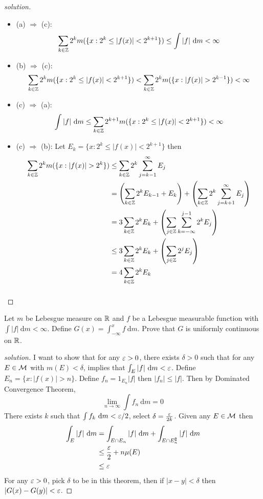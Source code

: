 \begin{proof}[solution]
  \begin{itemize}
    \item (a) $\Rightarrow$ (c): 
      \[\sum_{k \in \mathbb Z} 2^km(\{x : 2^k \le |f(x)| < 2^{k+1}\}) \le \int |f| \ \mathrm{d}m < \infty\]
    \item (b) $\Rightarrow$ (c): 
    \[\sum_{k \in \mathbb Z} 2^km(\{x : 2^k \le |f(x)| < 2^{k+1}\}) < \sum_{k \in \mathbb Z} 2^km(\{x : |f(x)| > 2^{k-1}\}) < \infty\]
    \item (c) $\Rightarrow$ (a): 
    \[\int |f| \ \mathrm{d}m \le \sum_{k\in \mathbb Z} 2^{k+1}m(\{x : 2^k \le |f(x)| < 2^{k+1}\}) < \infty\]
    \item (c) $\Rightarrow$ (b): 
    Let $E_k = \{x : 2^k \le |f(x)| < 2^{k+1}\}$ then
    \begin{align*}
      \sum_{k \in \mathbb Z} 2^km(\{x : |f(x)| > 2^k\}) &\le \sum_{k \in \mathbb Z} 2^k \sum_{j=k-1}^\infty E_j\\
      &= \left(\sum_{k \in \mathbb Z} 2^k E_{k-1} + E_k\right) + \left(\sum_{k \in \mathbb Z}2^k\sum_{j=k+1}^\infty E_j\right) \\
      &= 3\sum_{k \in \mathbb Z} 2^kE_k + \left(\sum_{j \in \mathbb Z} \sum_{k=-\infty}^{j-1} 2^k E_j\right) \\
      &\le 3\sum_{k \in \mathbb Z} 2^kE_k + \left(\sum_{j \in \mathbb Z} 2^j E_j\right) \\
      &= 4\sum_{k \in \mathbb Z} 2^kE_k
    \end{align*}
    \[ \]
  \end{itemize}
\end{proof}

\begin{problem}
  Let $m$ be Lebesgue measure on $\mathbb R$ and $f$ be a Lebesgue measurable function with $\int |f|\ \mathrm{d}m < \infty$. 
  Define $G(x) = \int_{-\infty}^x f\ \mathrm{d}m$. Prove that $G$ is uniformly continuous on $\mathbb R$.
\end{problem}

\begin{proof}[solution]
  I want to show that for any $\varepsilon > 0$, there exists $\delta > 0$ such that for any $E \in \mathcal M$ with $m(E) < \delta$,
  implies that $\int_E |f|\ \mathrm{d}m < \varepsilon$. Define $E_n = \{x : |f(x)| > n\}$.
  Define $f_n = 1_{E_n}|f|$ then $|f_n| \le |f|$. Then by Dominated Convergence Theorem,
  \[\lim_{n\to\infty}\int f_n \ \mathrm{d}m = 0\]
  There exists $k$ such that $\int f_k \ \mathrm{d}m < \varepsilon/2$, select $\delta = \frac{\varepsilon}{2k}$.
  Given any $E \in \mathcal M$ then 
  \begin{align*}
    \int_E |f|\ \mathrm{d}m &= \int_{E \cap E_n} |f|\ \mathrm{d}m + \int_{E \cap E_n^\complement} |f|\ \mathrm{d}m\\
    &\le \frac{\varepsilon}2+ n\mu(E) \\
    &\le \varepsilon
  \end{align*}
  For any $\varepsilon > 0$, pick $\delta$ to be in this theorem, then 
  if $|x - y| < \delta$ then $|G(x) - G(y)| < \varepsilon$. 
\end{proof}

